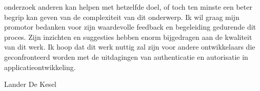 onderzoek anderen kan helpen met hetzelfde doel, of toch ten minste een beter begrip kan geven van de complexiteit van dit onderwerp.
\newline
\newline
Ik wil graag mijn promotor bedanken voor zijn waardevolle feedback en begeleiding gedurende dit proces. Zijn inzichten en suggesties hebben enorm bijgedragen aan de kwaliteit van dit werk. 
\newline
\newline
Ik hoop dat dit werk nuttig zal zijn voor andere ontwikkelaars die geconfronteerd worden met de uitdagingen van authenticatie en autorisatie in applicatieontwikkeling.

\begin{flushright}
Lander De Kesel
\end{flushright}
